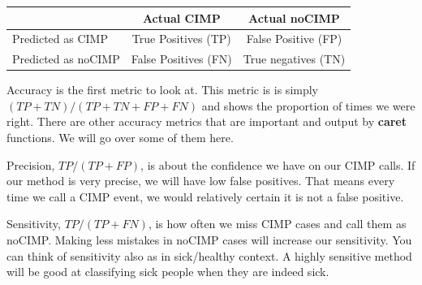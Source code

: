 \documentclass[12pt,]{krantz}
\begin{document}
\begin{longtable}[]{@{}lcc@{}}
\toprule
\begin{minipage}[b]{0.20\columnwidth}\raggedright
\strut
\end{minipage} & \begin{minipage}[b]{0.27\columnwidth}\centering
Actual CIMP\strut
\end{minipage} & \begin{minipage}[b]{0.28\columnwidth}\centering
Actual noCIMP\strut
\end{minipage}\tabularnewline
\midrule
\endhead
\begin{minipage}[t]{0.20\columnwidth}\raggedright
Predicted as
CIMP\strut
\end{minipage} & \begin{minipage}[t]{0.27\columnwidth}\centering
True Positives (TP)\strut
\end{minipage} & \begin{minipage}[t]{0.28\columnwidth}\centering
False Positive (FP)\strut
\end{minipage}\tabularnewline
\begin{minipage}[t]{0.20\columnwidth}\raggedright
Predicted as
noCIMP\strut
\end{minipage} & \begin{minipage}[t]{0.27\columnwidth}\centering
False Positives (FN)\strut
\end{minipage} & \begin{minipage}[t]{0.28\columnwidth}\centering
True negatives (TN)\strut
\end{minipage}\tabularnewline
\bottomrule
\end{longtable}

Accuracy is the first metric to look at. This metric is is simply
\((TP+TN)/(TP+TN+FP+FN)\) and shows the proportion of times we were right. There are other accuracy metrics that are important and output by \textbf{caret} functions. We will go over some of them here.

Precision, \(TP/(TP+FP)\), is about the confidence we have on our CIMP calls. If our method is very precise, we will have low false positives. That means every time we call a CIMP event, we would relatively certain it is not a false positive.

Sensitivity, \(TP/(TP+FN)\), is how often we miss CIMP cases and call them as noCIMP. Making less mistakes in noCIMP cases will increase our sensitivity. You can think of sensitivity also as in sick/healthy context. A highly sensitive method will be good at classifying sick people when they are indeed sick.
\end{document}
